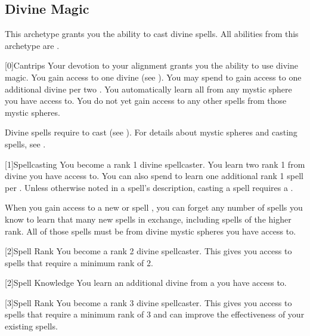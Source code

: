     \newpage
    \subsection{Divine Magic}
        This archetype grants you the ability to cast divine spells.
        All abilities from this archetype are .

        [0]{Cantrips}
        Your devotion to your alignment grants you the ability to use divine magic.
        You gain access to one divine  (see ).
        You may spend  to gain access to one additional divine  per two .
        You automatically learn all  from any mystic sphere you have access to.
        You do not yet gain access to any other spells from those mystic spheres.

        Divine spells require  to cast (see ).
        For details about mystic spheres and casting spells, see .

        [1]{Spellcasting}
        You become a rank 1 divine spellcaster.
        You learn two rank 1  from divine  you have access to.
        You can also spend  to learn one additional rank 1 spell per .
        Unless otherwise noted in a spell's description, casting a spell requires a .

        When you gain access to a new  or spell ,
            you can forget any number of spells you know to learn that many new spells in exchange,
            including spells of the higher rank.
        All of those spells must be from divine mystic spheres you have access to.

        [2]{Spell Rank} You become a rank 2 divine spellcaster.
        This gives you access to spells that require a minimum rank of 2.

        [2]{Spell Knowledge} You learn an additional divine  from a  you have access to.

        [3]{Spell Rank} You become a rank 3 divine spellcaster.
        This gives you access to spells that require a minimum rank of 3 and can improve the effectiveness of your existing spells.

